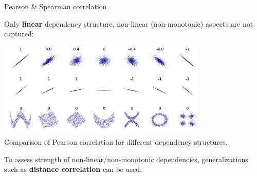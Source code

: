 \documentclass[11pt,compress,t,notes=noshow, xcolor=table]{beamer}
\begin{document}
\begin{frame2}{Pearson \& Spearman correlation}

Only \textbf{linear} dependency structure, non-linear (non-monotonic) aspects are not captured:

\lz

\begin{center}
\includegraphics[width=0.75\textwidth]{sl/feature-selection/figure_man/correlation_example.png}\\
\footnotesize{Comparison of Pearson correlation for different dependency structures.}
\end{center}
\vspace{0.1cm}
To assess strength of non-linear/non-monotonic dependencies, generalizations such as \textbf{distance correlation} can be used.

% 
% 
% 
% 
% 
\end{frame2}
\end{document}
